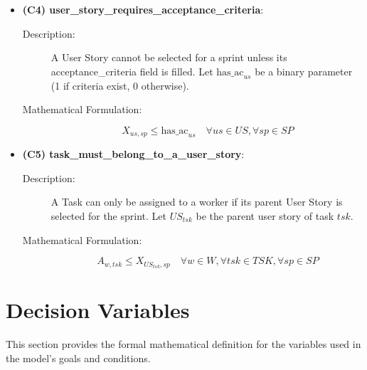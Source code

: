 \documentclass[11pt]{article}
\begin{document}
\begin{itemize}
    \item \textbf{(C4) user\_story\_requires\_acceptance\_criteria}:
    \begin{description}
        \item[Description:] A User Story cannot be selected for a sprint unless its acceptance\_criteria field is filled. Let $\text{has\_ac}_{us}$ be a binary parameter (1 if criteria exist, 0 otherwise).
        \item[Mathematical Formulation:]
        $$ X_{us, sp} \le \text{has\_ac}_{us} \quad \forall us \in US, \forall sp \in SP $$
    \end{description}

    \item \textbf{(C5) task\_must\_belong\_to\_a\_user\_story}:
    \begin{description}
        \item[Description:] A Task can only be assigned to a worker if its parent User Story is selected for the sprint. Let $US_{tsk}$ be the parent user story of task $tsk$.
        \item[Mathematical Formulation:]
        $$ A_{w, tsk} \le X_{US_{tsk}, sp} \quad \forall w \in W, \forall tsk \in TSK, \forall sp \in SP $$
    \end{description}
\end{itemize}

\section{Decision Variables}
\label{sec:decision_variables}
This section provides the formal mathematical definition for the variables used in the model's goals and conditions.
\end{document}
